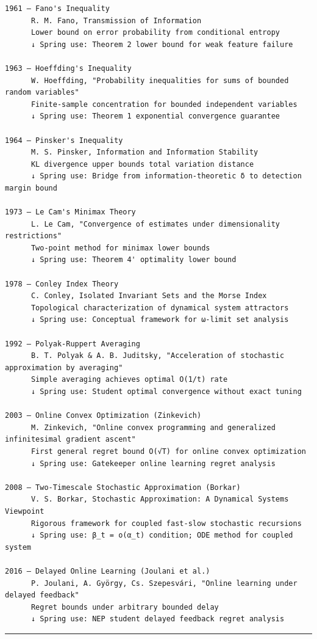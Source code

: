 \documentclass[
  12pt,
]{article}
\begin{document}
\begin{verbatim}
1961 — Fano's Inequality
      R. M. Fano, Transmission of Information
      Lower bound on error probability from conditional entropy
      ↓ Spring use: Theorem 2 lower bound for weak feature failure

1963 — Hoeffding's Inequality
      W. Hoeffding, "Probability inequalities for sums of bounded random variables"
      Finite-sample concentration for bounded independent variables
      ↓ Spring use: Theorem 1 exponential convergence guarantee

1964 — Pinsker's Inequality
      M. S. Pinsker, Information and Information Stability
      KL divergence upper bounds total variation distance
      ↓ Spring use: Bridge from information-theoretic δ to detection margin bound

1973 — Le Cam's Minimax Theory
      L. Le Cam, "Convergence of estimates under dimensionality restrictions"
      Two-point method for minimax lower bounds
      ↓ Spring use: Theorem 4' optimality lower bound

1978 — Conley Index Theory
      C. Conley, Isolated Invariant Sets and the Morse Index
      Topological characterization of dynamical system attractors
      ↓ Spring use: Conceptual framework for ω-limit set analysis

1992 — Polyak-Ruppert Averaging
      B. T. Polyak & A. B. Juditsky, "Acceleration of stochastic approximation by averaging"
      Simple averaging achieves optimal O(1/t) rate
      ↓ Spring use: Student optimal convergence without exact tuning

2003 — Online Convex Optimization (Zinkevich)
      M. Zinkevich, "Online convex programming and generalized infinitesimal gradient ascent"
      First general regret bound O(√T) for online convex optimization
      ↓ Spring use: Gatekeeper online learning regret analysis

2008 — Two-Timescale Stochastic Approximation (Borkar)
      V. S. Borkar, Stochastic Approximation: A Dynamical Systems Viewpoint
      Rigorous framework for coupled fast-slow stochastic recursions
      ↓ Spring use: β_t = o(α_t) condition; ODE method for coupled system

2016 — Delayed Online Learning (Joulani et al.)
      P. Joulani, A. György, Cs. Szepesvári, "Online learning under delayed feedback"
      Regret bounds under arbitrary bounded delay
      ↓ Spring use: NEP student delayed feedback regret analysis
\end{verbatim}

\begin{center}\rule{0.5\linewidth}{0.5pt}\end{center}
\end{document}
